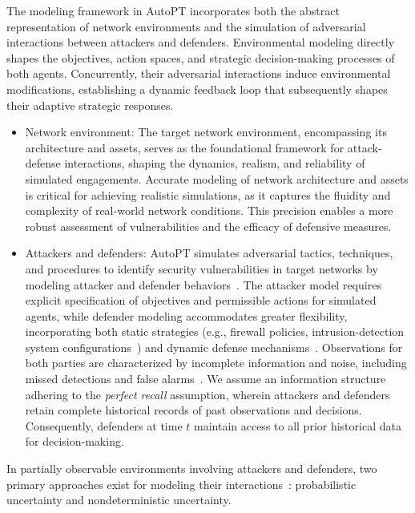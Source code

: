 The modeling framework in AutoPT incorporates both the abstract representation of network environments and the simulation of adversarial interactions between attackers and defenders. Environmental modeling directly shapes the objectives, action spaces, and strategic decision-making processes of both agents. Concurrently, their adversarial interactions induce environmental modifications, establishing a dynamic feedback loop that subsequently shapes their adaptive strategic responses.

\begin{itemize}
    \item Network environment: The target network environment, encompassing its architecture and assets, serves as the foundational framework for attack-defense interactions, shaping the dynamics, realism, and reliability of simulated engagements. Accurate modeling of network architecture and assets is critical for achieving realistic simulations, as it captures the fluidity and complexity of real-world network conditions. This precision enables a more robust assessment of vulnerabilities and the efficacy of defensive measures.
    \item Attackers and defenders: AutoPT simulates adversarial tactics, techniques, and procedures to identify security vulnerabilities in target networks by modeling attacker and defender behaviors~\cite{chenke2023survey}. The attacker model requires explicit specification of objectives and permissible actions for simulated agents, while defender modeling accommodates greater flexibility, incorporating both static strategies (e.g., firewall policies, intrusion-detection system configurations~\cite{furfaro2017using}) and dynamic defense mechanisms~\cite{applebaum2016intelligent}. Observations for both parties are characterized by incomplete information and noise, including missed detections and false alarms~\cite{ErikMiehling2019Control}. We assume an information structure adhering to the \textit{perfect recall} assumption, wherein attackers and defenders retain complete historical records of past observations and decisions. Consequently, defenders at time $t$ maintain access to all prior historical data for decision-making.
\end{itemize}
In partially observable environments involving attackers and defenders, two primary approaches exist for modeling their interactions~\cite{ErikMiehling2019Control}: probabilistic uncertainty and nondeterministic uncertainty.
